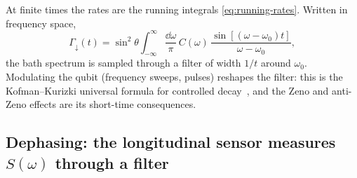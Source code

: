 At finite times the rates are the running integrals \eqref{eq:running-rates}.
Written in frequency space,
\begin{equation}
  \Gamma_\downarrow(t)=\sin^2\theta\int_{-\infty}^\infty\!\frac{\dd\omega}{\pi}\,C(\omega)\,\frac{\sin[(\omega-\omega_0)t]}{\omega-\omega_0},
  \label{eq:kofman}
\end{equation}
the bath spectrum is sampled through a filter of width $1/t$ around $\omega_0$.
Modulating the qubit (frequency sweeps, pulses) reshapes the filter: this is the Kofman--Kurizki universal formula for controlled decay~\cite{Kofman2000,Kofman2001}, and the Zeno and anti-Zeno effects are its short-time consequences.

\subsection{Dephasing: the longitudinal sensor measures \texorpdfstring{$S(\omega)$}{S(omega)} through a filter}

